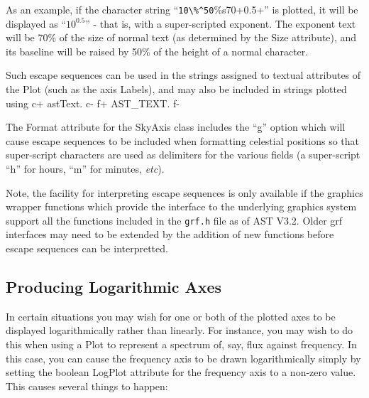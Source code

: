 \documentclass[twoside,11pt]{starlink}
\begin{document}
As an example, if the character string ``\verb+10\%^50+\%s70+0.5+'' is
plotted, it will be displayed as ``$10^{0.5}$'' - that is, with a
super-scripted exponent. The exponent text will be 70\% of the size of
normal text (as determined by the Size attribute), and its baseline will
be raised by 50\% of the height of a normal character.

Such escape sequences can be used in the strings assigned to textual
attributes of the Plot (such as the axis Labels), and may also be
included in strings plotted using
c+
astText.
c-
f+
AST\_TEXT.
f-

The Format attribute for the SkyAxis class includes the ``g'' option
which will cause escape sequences to be included when formatting
celestial positions so that super-script characters are used as
delimiters for the various fields (a super-script ``h'' for hours, ``m''
for minutes, \emph{etc}).

Note, the facility for interpreting escape sequences is only available if
the graphics wrapper functions which provide the interface to the
underlying graphics system support all the functions included in the
\verb+grf.h+ file as of AST V3.2. Older grf interfaces may need to be
extended by the addition of new functions before escape sequences can be
interpretted.

\subsection{\label{ss:logaxes}Producing Logarithmic Axes}
In certain situations you may wish for one or both of the plotted axes to
be displayed logarithmically rather than linearly. For instance, you may
wish to do this when using a Plot to represent a spectrum of, say, flux
against frequency. In this case, you can cause the frequency axis to be drawn
logarithmically simply by setting the boolean LogPlot attribute for the
frequency axis to a non-zero value. This causes several things to happen:
\end{document}
